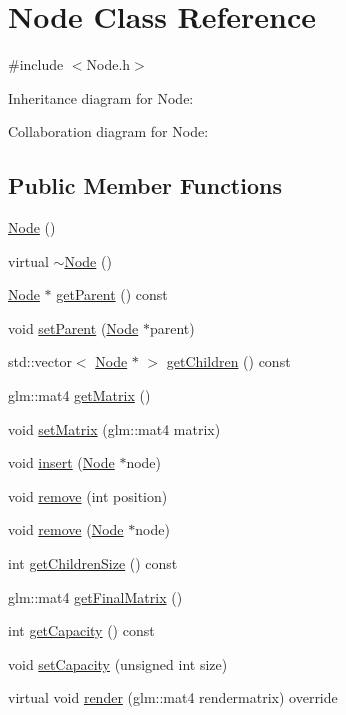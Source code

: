 \hypertarget{classNode}{}\section{Node Class Reference}
\label{classNode}


{\ttfamily \#include $<$Node.\+h$>$}



Inheritance diagram for Node\+:


Collaboration diagram for Node\+:
\subsection*{Public Member Functions}
\begin{DoxyCompactItemize}
\item 
\hyperlink{classNode_ad7a34779cad45d997bfd6d3d8043c75f}{Node} ()
\item 
virtual \hyperlink{classNode_aa0840c3cb5c7159be6d992adecd2097c}{$\sim$\+Node} ()
\item 
\hyperlink{classNode}{Node} $\ast$ \hyperlink{classNode_a3cad655320d50751c43c5cec9356dcf3}{get\+Parent} () const
\item 
void \hyperlink{classNode_ab5f0786bcb59591c528efb0b776797fc}{set\+Parent} (\hyperlink{classNode}{Node} $\ast$parent)
\item 
std\+::vector$<$ \hyperlink{classNode}{Node} $\ast$ $>$ \hyperlink{classNode_a35d2158fc55fc34a4944bca1e4ca59bd}{get\+Children} () const
\item 
glm\+::mat4 \hyperlink{classNode_a114b338b42c09c85698b4642f1c81215}{get\+Matrix} ()
\item 
void \hyperlink{classNode_a19426bb52ce3ea720ff70138f9af8e59}{set\+Matrix} (glm\+::mat4 matrix)
\item 
void \hyperlink{classNode_a9445bb4d5ae1ef69ab32d3d2780d0082}{insert} (\hyperlink{classNode}{Node} $\ast$node)
\item 
void \hyperlink{classNode_a25d070363e33ff1e4542d5c203c3c8fa}{remove} (int position)
\item 
void \hyperlink{classNode_adf26cf6f2c8964d0095cbce8ac849499}{remove} (\hyperlink{classNode}{Node} $\ast$node)
\item 
int \hyperlink{classNode_a8b2eb1a36124349b3c28cdd276a4a916}{get\+Children\+Size} () const
\item 
glm\+::mat4 \hyperlink{classNode_a3556d0ec8cd06e589d90f04b348bddd4}{get\+Final\+Matrix} ()
\item 
int \hyperlink{classNode_a5314d9f959698d8658c8e4b363e7ac8a}{get\+Capacity} () const
\item 
void \hyperlink{classNode_a7665075c56908bb07657ee0ed2f25dfb}{set\+Capacity} (unsigned int size)
\item 
virtual void \hyperlink{classNode_a7faebb78a04b6421dbf5afe998f7658d}{render} (glm\+::mat4 rendermatrix) override
\end{DoxyCompactItemize}
